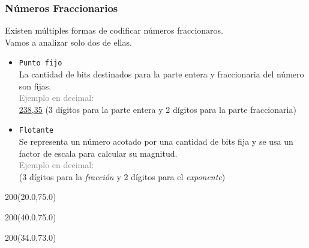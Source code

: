 \documentclass[aspectratio=169]{beamer}
\begin{document}

\begin{frame}[fragile,t]
    \frametitle{Números Fraccionarios}
    Existen múltiples formas de codificar números fraccionaros.\\
    Vamos a analizar solo dos de ellas.\\
    \vspace{0.5cm}
    \pause
    \begin{itemize}
    \item \textcolor{naranjauca}{\texttt{Punto fijo}}\\
    La cantidad de bits destinados para la parte entera y fraccionaria del número son fijas.\\
    { \footnotesize \textcolor{gray}{Ejemplo en decimal:} \\
    \hspace{1cm} \ul{2}\hspace{0.05cm}\ul{3}\hspace{0.05cm}\ul{8}\hspace{0.05cm},\hspace{0.05cm}\ul{3}\hspace{0.05cm}\ul{5}
    \hspace{0.2cm} \textcolor{verdeuca}{(3 dígitos para la parte entera y 2 dígitos para la parte fraccionaria) } }
    \vspace{0.5cm}
    \pause
    \item \textcolor{naranjauca}{\texttt{Flotante}}\\
    Se representa un número acotado por una cantidad de bits fija y se usa un factor de escala para calcular su magnitud.\\
    { \footnotesize \textcolor{gray}{Ejemplo en decimal:} \\
    \vspace{0.3cm} \hspace{5cm} \textcolor{verdeuca}{(3 dígitos para la \textit{fracción} y 2 dígitos para el \textit{exponente}) } }
    \end{itemize}
    \begin{textblock}{200}(20.0,75.0) {  } \end{textblock}
    \begin{textblock}{200}(40.0,75.0) {  } \end{textblock}
    \begin{textblock}{200}(34.0,73.0) {  } \end{textblock}
\end{frame}
\end{document}
